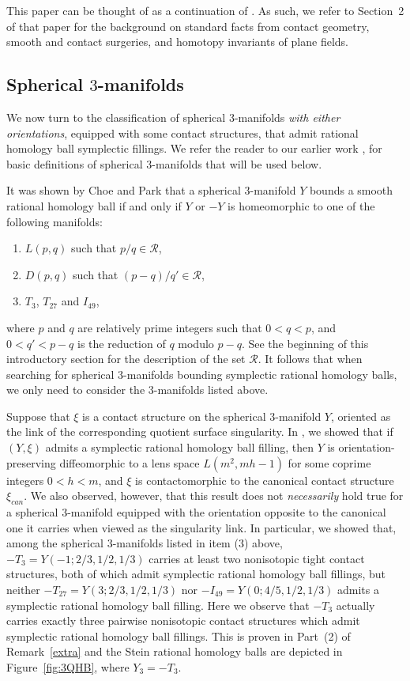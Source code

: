 \documentclass[11pt]{amsart}
\theoremstyle{plain}
\theoremstyle{definition}
\theoremstyle{remark}
\numberwithin{theorem}{section}
\begin{document}
This paper can be thought of as a continuation of \cite{EtnyreOzbagciTosun2025}. As such, we refer to Section~2 of that paper for the background on standard facts from contact geometry, smooth and contact surgeries, and homotopy invariants of plane fields. 

\subsection{Spherical $3$-manifolds}\label{spherical}
We now turn to the classification of spherical $3$-manifolds {\em with either orientations}, equipped with some contact structures,  that admit rational homology ball symplectic fillings. We refer the reader to our earlier work \cite{EtnyreOzbagciTosun2025}, for basic definitions of spherical $3$-manifolds  that will be used below. 

It was shown by Choe and Park \cite{ChoePark2021}  that a spherical $3$-manifold $Y$ bounds a smooth rational homology ball if and only if $Y$ or $-Y$ is homeomorphic to one of the following manifolds: 
\begin{enumerate}
\item $L(p, q)$ such that $p/q \in\mathcal{R}$,
\item\label{2} $D(p, q)$ such that $(p-q)/q' \in\mathcal{R}$,
\item\label{3} $T_3$, $T_{27}$ and $I_{49}$, 
\end{enumerate}
where $p$ and $q$ are relatively prime integers such that $0 < q < p$, and $0 < q' < p - q$ is
the reduction of $q$ modulo $p - q$. See the beginning of this introductory section for the description of the set $\mathcal{R}$. It follows that when searching for spherical $3$-manifolds bounding symplectic rational homology balls, we only need to consider the $3$-manifolds listed above.  

Suppose that  $\xi$ is a contact structure on the spherical $3$-manifold $Y$, oriented as the link of the corresponding quotient surface singularity. In \cite{EtnyreOzbagciTosun2025}, we showed that if $(Y, \xi)$ admits a symplectic rational homology ball filling,  then $Y$ is orientation-preserving diffeomorphic to a lens space $L(m^2,mh-1)$ for some coprime integers $0< h < m$, and $\xi$ is contactomorphic to the canonical contact structure $\xi_{can}$. We also observed, however, that this result does not {\em necessarily} hold true for a spherical $3$-manifold  equipped with the orientation opposite to the canonical one it carries when viewed as the singularity link. In particular, we showed that, among the spherical $3$-manifolds listed in item (3) above, $-T_3=Y(-1; 2/3, 1/2, 1/3)$ carries at least two nonisotopic tight contact structures, both of which admit symplectic rational homology ball fillings, but neither $-T_{27}=Y(3; 2/3, 1/2, 1/3)$ nor $-I_{49}=Y(0; 4/5, 1/2, 1/3)$ admits a symplectic rational homology ball filling. 
Here we observe that $-T_3$ actually carries exactly three pairwise nonisotopic contact structures which admit symplectic rational homology ball fillings. This is proven in Part~(2) of Remark~\ref{extra} and the Stein rational homology balls are depicted in Figure~\ref{fig:3QHB}, where $Y_3=-T_3$. 
  
\end{document}
